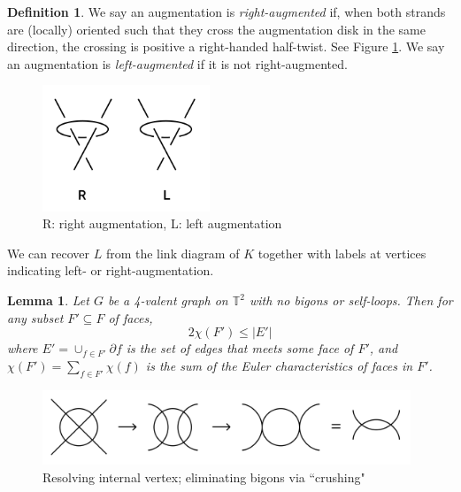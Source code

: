 \documentclass[11pt]{amsart}
\newcommand{\torus}{{\mathbb{T}^2}}
\newcommand{\del}{\partial}
\theoremstyle{plain}
\newtheorem{lemma}[theorem]{Lemma}
\theoremstyle{definition}
\newtheorem{define}[theorem]{Definition}
\begin{document}
\begin{define}
We say an augmentation is \emph{right-augmented} if, when both strands are
(locally) oriented such that they cross the augmentation disk in the same
direction, the crossing is positive a right-handed half-twist.
See Figure \ref{f:right_left_aug}.
We say an augmentation is \emph{left-augmented} if it is not right-augmented.
\end{define}

\begin{figure}
\includegraphics[width=5cm]{more_pictures/right_left_aug.png}
\caption{R: right augmentation, L: left augmentation}
\label{f:right_left_aug}
\end{figure}

We can recover $L$ from the link diagram of $K$
together with labels at vertices indicating left- or right-augmentation.


\begin{lemma}
\label{l:2fe}
Let $G$ be a 4-valent graph on $\torus$ with no bigons or self-loops.
Then for any subset $F' \subseteq F$ of faces,
\[
	2\chi(F') \leq |E'|
\]
where $E' = \cup_{f \in F'} \del f$ is the set of edges
that meets some face of $F'$,
and $\chi(F') = \sum_{f\in F'} \chi(f)$ is the sum
of the Euler characteristics of faces in $F'$.
\end{lemma}

\begin{figure}
\includegraphics[width=11cm]{bigon_crush}
\caption{Resolving internal vertex; eliminating bigons via ``crushing"}
\label{f:bigon_crush}
\end{figure}
\end{document}
